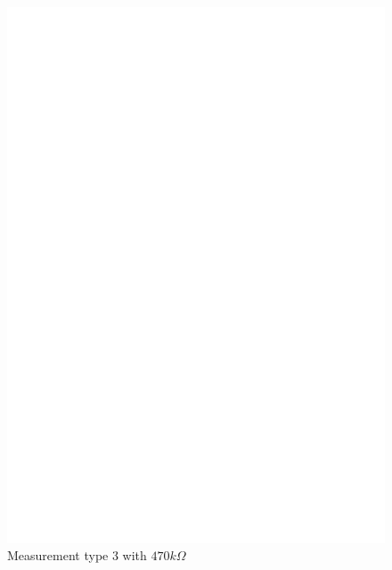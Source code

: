 \begin{figure}[H]
\centering
\includegraphics[]{../FIG/ResistormessH1.eps}
\caption{Measurement type 3 with \(470k\Omega\) }
\label{fig:RH1mes}
\end{figure}

